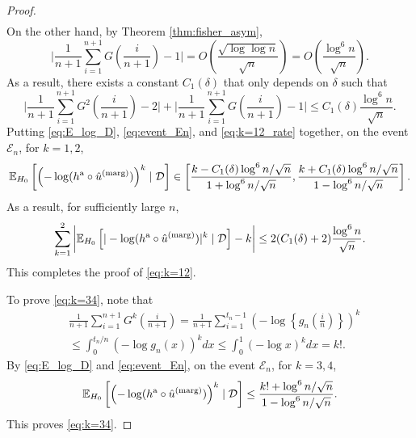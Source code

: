 \documentclass[11pt]{article}
\def\E{\mathbb{E}}
\def\marg{\textnormal{(marg)}}
\def\asym{\textnormal{a}}
\newcommand{\D}{\mathcal{D}}
\newcommand{\event}{\mathcal{E}}
\newcommand{\lb}{\left(}
\newcommand{\rb}{\right)}
\begin{document}
\begin{proof}
\begin{align*}
    \end{align*}
  On the other hand, by Theorem \ref{thm:fisher_asym},
  \[\bigg|\frac{1}{n+1}\sum_{i=1}^{n+1} G\lb\frac{i}{n+1}\rb - 1\bigg| = O\lb \frac{\sqrt{\log\log n}}{\sqrt{n}}\rb =  O\lb \frac{\log^6 n}{\sqrt{n}}\rb.\]
  As a result, there exists a constant $C_1(\delta)$ that only depends on $\delta$ such that
  \begin{equation}
    \label{eq:k=12_rate}
    \bigg|\frac{1}{n+1}\sum_{i=1}^{n+1}G^2\left(\frac{i}{n+1}\right) - 2\bigg| + \bigg|\frac{1}{n+1}\sum_{i=1}^{n+1}G\left(\frac{i}{n+1}\right) - 1\bigg|\le C_1(\delta)\frac{\log^6 n}{\sqrt{n}}.
  \end{equation}
    Putting \eqref{eq:E_log_D}, \eqref{eq:event_En}, and \eqref{eq:k=12_rate} together, on the event $\event_{n}$, for $k = 1,2$, 
    \[\E_{H_0}\left[\lb -\log (h^\asym \circ \hat{u}^\marg)\rb^{k}\mid \D\right]\in \left[\frac{k - C_1(\delta) \log^6 n / \sqrt{n}}{1 + \log^6 n / \sqrt{n}}, \frac{k + C_1(\delta) \log^6 n / \sqrt{n}}{1 - \log^6 n / \sqrt{n}}\right].\]
    As a result, for sufficiently large $n$, 
  \[\sum_{k=1}^{2}\bigg|\E_{H_0}\left[|-\log (h^\asym \circ \hat{u}^\marg)|^k\mid \D\right] - k\bigg| \le 2(C_1(\delta) + 2)\frac{\log^6 n}{\sqrt{n}}.\]
  This completes the proof of \eqref{eq:k=12}.

  To prove \eqref{eq:k=34}, note that
  \begin{align*}
    &\frac{1}{n+1}\sum_{i=1}^{n+1}G^k\left(\frac{i}{n+1}\right) = \frac{1}{n+1}\sum_{i=1}^{t_n - 1} \lb -\log \left\{g_n\lb\frac{i}{n}\rb\right\}\rb^{k}\\
& \le \int_{0}^{t_n/n}\lb-\log g_n(x)\rb^k dx\le \int_{0}^{1}\lb-\log x\rb^k dx = k!.
  \end{align*}
  By \eqref{eq:E_log_D} and \eqref{eq:event_En}, on the event $\event_{n}$, for $k = 3,4$,
  \[\E_{H_0}\left[\lb -\log (h^\asym \circ \hat{u}^\marg)\rb^{k}\mid \D\right]\le \frac{k! + \log^6 n / \sqrt{n}}{1 - \log^6 n / \sqrt{n}}.\]
  This proves \eqref{eq:k=34}.
\end{proof}
\end{document}
